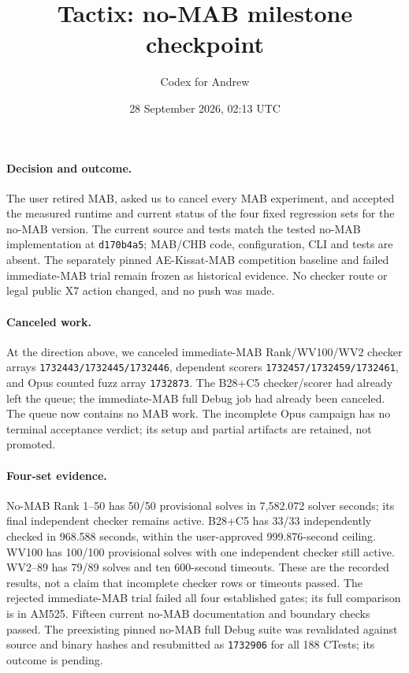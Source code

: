 \documentclass[11pt]{article}
\title{Tactix: no-MAB milestone checkpoint}
\author{Codex for Andrew}
\date{28 September 2026, 02:13 UTC}
\begin{document}
\maketitle

\paragraph{Decision and outcome.}
The user retired MAB, asked us to cancel every MAB experiment, and accepted the measured runtime and current status of the four fixed regression sets for the no-MAB version. The current source and tests match the tested no-MAB implementation at \texttt{d170b4a5}; MAB/CHB code, configuration, CLI and tests are absent. The separately pinned AE-Kissat-MAB competition baseline and failed immediate-MAB trial remain frozen as historical evidence. No checker route or legal public X7 action changed, and no push was made.

\paragraph{Canceled work.}
At the direction above, we canceled immediate-MAB Rank/WV100/WV2 checker arrays \texttt{1732443/1732445/1732446}, dependent scorers \texttt{1732457/1732459/1732461}, and Opus counted fuzz array \texttt{1732873}. The B28+C5 checker/scorer had already left the queue; the immediate-MAB full Debug job had already been canceled. The queue now contains no MAB work. The incomplete Opus campaign has no terminal acceptance verdict; its setup and partial artifacts are retained, not promoted.

\paragraph{Four-set evidence.}
No-MAB Rank 1--50 has 50/50 provisional solves in 7,582.072 solver seconds; its final independent checker remains active. B28+C5 has 33/33 independently checked in 968.588 seconds, within the user-approved 999.876-second ceiling. WV100 has 100/100 provisional solves with one independent checker still active. WV2--89 has 79/89 solves and ten 600-second timeouts. These are the recorded results, not a claim that incomplete checker rows or timeouts passed. The rejected immediate-MAB trial failed all four established gates; its full comparison is in AM525. Fifteen current no-MAB documentation and boundary checks passed. The preexisting pinned no-MAB full Debug suite was revalidated against source and binary hashes and resubmitted as \texttt{1732906} for all 188 CTests; its outcome is pending.
\end{document}
